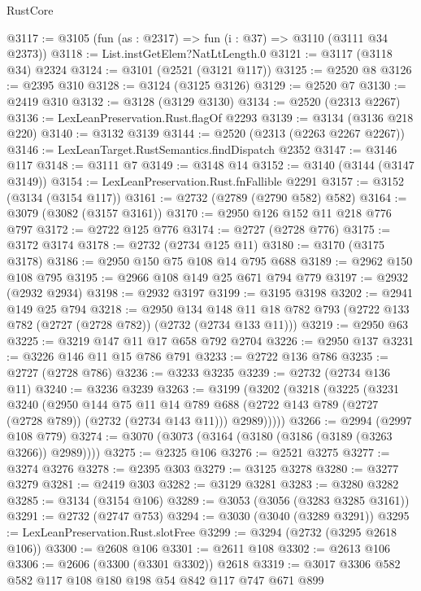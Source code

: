 \begin{lexlean}{RustCore}
\begin{coremodule}
@3117 := @3105 (fun (as : @2317) => fun (i : @37) => @3110 (@3111 @34 @2373))
@3118 := List.instGetElem?NatLtLength.{0}
@3121 := @3117 (@3118 @34) @2324
@3124 := @3101 (@2521 (@3121 @117))
@3125 := @2520 @8
@3126 := @2395 @310
@3128 := @3124 (@3125 @3126)
@3129 := @2520 @7
@3130 := @2419 @310
@3132 := @3128 (@3129 @3130)
@3134 := @2520 (@2313 @2267)
@3136 := LexLeanPreservation.Rust.flagOf @2293
@3139 := @3134 (@3136 @218 @220)
@3140 := @3132 @3139
@3144 := @2520 (@2313 (@2263 @2267 @2267))
@3146 := LexLeanTarget.RustSemantics.findDispatch @2352
@3147 := @3146 @117
@3148 := @3111 @7
@3149 := @3148 @14
@3152 := @3140 (@3144 (@3147 @3149))
@3154 := LexLeanPreservation.Rust.fnFallible @2291
@3157 := @3152 (@3134 (@3154 @117))
@3161 := @2732 (@2789 (@2790 @582) @582)
@3164 := @3079 (@3082 (@3157 @3161))
@3170 := @2950 @126 @152 @11 @218 @776 @797
@3172 := @2722 @125 @776
@3174 := @2727 (@2728 @776)
@3175 := @3172 @3174
@3178 := @2732 (@2734 @125 @11)
@3180 := @3170 (@3175 @3178)
@3186 := @2950 @150 @75 @108 @14 @795 @688
@3189 := @2962 @150 @108 @795
@3195 := @2966 @108 @149 @25 @671 @794 @779
@3197 := @2932 (@2932 @2934)
@3198 := @2932 @3197
@3199 := @3195 @3198
@3202 := @2941 @149 @25 @794
@3218 := @2950
    @134
    @148
    @11
    @18
    @782
    @793
    (@2722 @133 @782 (@2727 (@2728 @782)) (@2732 (@2734 @133 @11)))
@3219 := @2950 @63
@3225 := @3219 @147 @11 @17 @658 @792 @2704
@3226 := @2950 @137
@3231 := @3226 @146 @11 @15 @786 @791
@3233 := @2722 @136 @786
@3235 := @2727 (@2728 @786)
@3236 := @3233 @3235
@3239 := @2732 (@2734 @136 @11)
@3240 := @3236 @3239
@3263 := @3199
    (@3202
      (@3218
        (@3225
          (@3231
            @3240
            (@2950
              @144
              @75
              @11
              @14
              @789
              @688
              (@2722 @143 @789 (@2727 (@2728 @789)) (@2732 (@2734 @143 @11)))
              @2989)))))
@3266 := @2994 (@2997 @108 @779)
@3274 := @3070 (@3073 (@3164 (@3180 (@3186 (@3189 (@3263 @3266)) @2989))))
@3275 := @2325 @106
@3276 := @2521 @3275
@3277 := @3274 @3276
@3278 := @2395 @303
@3279 := @3125 @3278
@3280 := @3277 @3279
@3281 := @2419 @303
@3282 := @3129 @3281
@3283 := @3280 @3282
@3285 := @3134 (@3154 @106)
@3289 := @3053 (@3056 (@3283 @3285 @3161))
@3291 := @2732 (@2747 @753)
@3294 := @3030 (@3040 (@3289 @3291))
@3295 := LexLeanPreservation.Rust.slotFree
@3299 := @3294 (@2732 (@3295 @2618 @106))
@3300 := @2608 @106
@3301 := @2611 @108
@3302 := @2613 @106
@3306 := @2606 (@3300 (@3301 @3302)) @2618
@3319 := @3017 @3306 @582 @582 @117 @108 @180 @198 @54 @842 @117 @747 @671 @899

\end{coremodule}
\end{lexlean}
